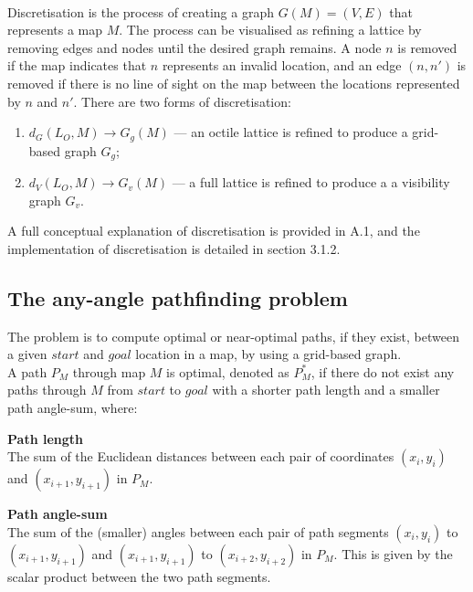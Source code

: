 \documentclass[12pt,notitlepage]{report}
\begin{document}
\\
\noindent
Discretisation is the process of creating a graph $G(M)=(V,E)$ that represents a map $M$. The process can be visualised as refining a lattice by removing edges and nodes until the desired graph remains. A node $n$ is removed if the map indicates that $n$ represents an invalid location, and an edge $(n,n')$ is removed if there is no line of sight on the map between the locations represented by $n$ and $n'$. There are two forms of discretisation:
\begin{enumerate}
\item $d_{G}(L_{O},M) \rightarrow G_{g}(M)$ --- an octile lattice is refined to produce a grid-based graph $G_{g}$;
\item  $d_{V}(L_{O},M) \rightarrow G_{v}(M)$ --- a full lattice is refined to produce a a visibility graph $G_{v}$.
\end{enumerate}
 
\noindent
A full conceptual explanation of discretisation is provided in A.1, and the implementation of discretisation is detailed in section 3.1.2.

\subsection{The any-angle pathfinding problem}

The problem is to compute optimal or near-optimal paths, if they exist, between a given $start$ and $goal$ location in a map, by using a grid-based graph.\\

\noindent
A path $P_{M}$ through map $M$ is optimal, denoted as $P^{*}_{M}$, if there do not exist any paths through $M$ from $start$ to $goal$ with a shorter path length and a smaller path angle-sum, where:

\begin{description}
\item{\bfseries Path length}\\
The sum of the Euclidean distances between each pair of coordinates $(x_{i},y_{i})$ and $(x_{i+1},y_{i+1})$ in $P_{M}$.
\item{\bfseries Path angle-sum}\\
The sum of the (smaller) angles between each pair of path segments $(x_{i},y_{i})$ to $(x_{i+1},y_{i+1})$ and $(x_{i+1},y_{i+1})$ to $(x_{i+2},y_{i+2})$ in $P_{M}$. This is given by the scalar product between the two path segments.
\end{description}
\end{document}
